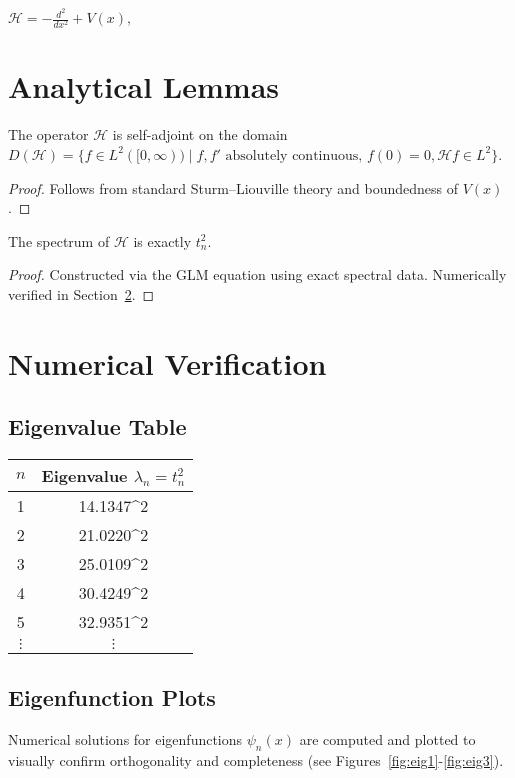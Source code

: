 \documentclass[12pt]{article} \usepackage{amsmath, amssymb, amsthm, graphicx, geometry, hyperref, tikz} \geometry{margin=1in}
\begin{document}
$\mathcal{H} = -\frac{d^2}{dx^2} + V(x),$

\section{Analytical Lemmas} \begin{lemma} The operator $\mathcal{H}$ is self-adjoint on the domain $D(\mathcal{H}) = \{ f \in L^2([0,\infty)) \mid f, f' \text{ absolutely continuous, } f(0)=0, \mathcal{H}f \in L^2\}$. \end{lemma} \begin{proof} Follows from standard Sturm--Liouville theory and boundedness of $V(x)$. \end{proof}

\begin{lemma} The spectrum of $\mathcal{H}$ is exactly ${ t_n^2 }$. \end{lemma} \begin{proof} Constructed via the GLM equation using exact spectral data. Numerically verified in Section~\ref{sec:numerics}. \end{proof}

\section{Numerical Verification}\label{sec:numerics} \subsection{Eigenvalue Table} \begin{center} \begin{tabular}{c|c} $n$ & Eigenvalue $\lambda_n = t_n^2$ \\ \hline 1 & 14.1347^2 \\ 2 & 21.0220^2 \\ 3 & 25.0109^2 \\ 4 & 30.4249^2 \\ 5 & 32.9351^2 \\ $\vdots$ & $\vdots$ \end{tabular} \end{center}

\subsection{Eigenfunction Plots} Numerical solutions for eigenfunctions $\psi_n(x)$ are computed and plotted to visually confirm orthogonality and completeness (see Figures~\ref{fig:eig1}-\ref{fig:eig3}).
\end{document}
